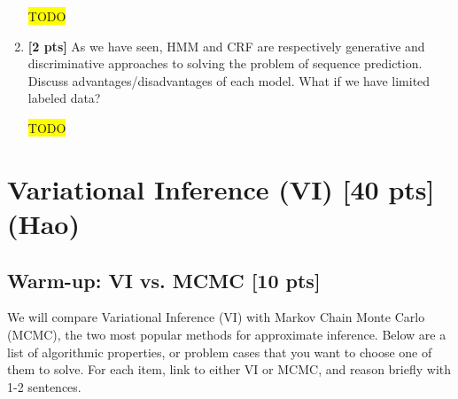 \documentclass[10pt]{article}
\newcommand{\hilight}[1]{\colorbox{yellow}{#1}}
\begin{document}
\begin{enumerate}
\begin{solution}
\hilight{TODO}
\end{solution}

    \item \textbf{[2 pts]} As we have seen, HMM and CRF are respectively generative and discriminative approaches to solving the problem of sequence prediction. Discuss advantages/disadvantages of each model. What if we have limited labeled data?

\begin{solution}
\hilight{TODO}
\end{solution}

\end{enumerate}



\newpage

\section{Variational Inference (VI) [40 pts] (Hao)}
\subsection{Warm-up: VI vs. MCMC [10 pts]}
We will compare Variational Inference (VI) with Markov Chain Monte Carlo (MCMC), the two most popular methods for approximate inference. Below are a list of algorithmic properties, or problem cases that you want to choose one of them to solve. For each item, link to either VI or MCMC, and reason briefly with 1-2 sentences.
\end{document}
